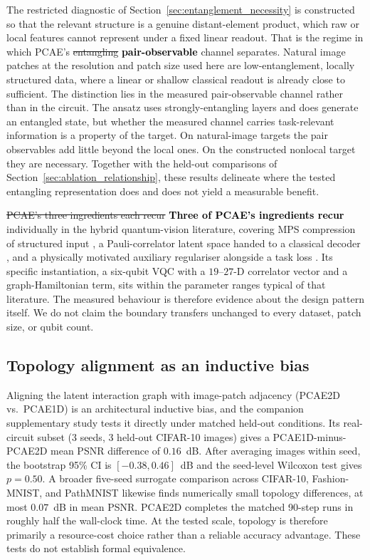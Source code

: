 \documentclass[pdflatex,sn-basic]{sn-jnl}
\newcommand{\del}[1]{\sout{#1}}
\newcommand{\add}[1]{\textbf{\textcolor{black}{#1}}}
\begin{document}
The restricted diagnostic of Section~\ref{sec:entanglement_necessity} is constructed so that the relevant structure is a genuine distant-element product, which raw or local features cannot represent under a fixed linear readout. That is the regime in which PCAE's \del{entangling} \add{pair-observable} channel separates. Natural image patches at the resolution and patch size used here are low-entanglement, locally structured data, where a linear or shallow classical readout is already close to sufficient. The distinction lies in the measured pair-observable channel rather than in the circuit. The ansatz uses strongly-entangling layers and does generate an entangled state, but whether the measured channel carries task-relevant information is a property of the target. On natural-image targets the pair observables add little beyond the local ones. On the constructed nonlocal target they are necessary. Together with the held-out comparisons of Section~\ref{sec:ablation_relationship}, these results delineate where the tested entangling representation does and does not yield a measurable benefit.

\del{PCAE's three ingredients each recur} \add{Three of PCAE's ingredients recur} individually in the hybrid quantum-vision literature, covering MPS compression of structured input \citep{Stoudenmire2016, Han2018, Cirac2021, Guala2023}, a Pauli-correlator latent space handed to a classical decoder \citep{Havlicek2019}, and a physically motivated auxiliary regulariser alongside a task loss \citep{Shi2022}. Its specific instantiation, a six-qubit VQC with a $19$--$27$-D correlator vector and a graph-Hamiltonian term, sits within the parameter ranges typical of that literature. The measured behaviour is therefore evidence about the design pattern itself. We do not claim the boundary transfers unchanged to every dataset, patch size, or qubit count.

\subsection{Topology alignment as an inductive bias}
\label{sec:topology}

Aligning the latent interaction graph with image-patch adjacency (PCAE2D vs.\ PCAE1D) is an architectural inductive bias, and the companion supplementary study tests it directly under matched held-out conditions. Its real-circuit subset (3 seeds, 3 held-out CIFAR-10 images) gives a PCAE1D-minus-PCAE2D mean PSNR difference of $0.16$~dB. After averaging images within seed, the bootstrap 95\% CI is $[-0.38,0.46]$~dB and the seed-level Wilcoxon test gives $p=0.50$. A broader five-seed surrogate comparison across CIFAR-10, Fashion-MNIST, and PathMNIST likewise finds numerically small topology differences, at most $0.07$~dB in mean PSNR. PCAE2D completes the matched 90-step runs in roughly half the wall-clock time. At the tested scale, topology is therefore primarily a resource-cost choice rather than a reliable accuracy advantage. These tests do not establish formal equivalence.
\end{document}
